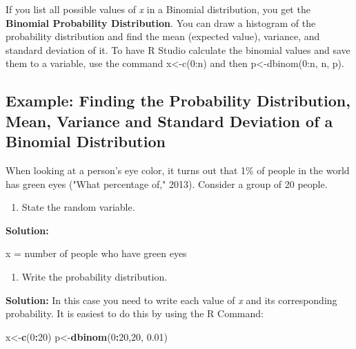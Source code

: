 \documentclass[]{book}
\newenvironment{Shaded}{\begin{snugshade}}{\end{snugshade}}
\newcommand{\DecValTok}[1]{\textcolor[rgb]{0.00,0.00,0.81}{#1}}
\newcommand{\FloatTok}[1]{\textcolor[rgb]{0.00,0.00,0.81}{#1}}
\newcommand{\KeywordTok}[1]{\textcolor[rgb]{0.13,0.29,0.53}{\textbf{#1}}}
\newcommand{\NormalTok}[1]{#1}
\newcommand{\OperatorTok}[1]{\textcolor[rgb]{0.81,0.36,0.00}{\textbf{#1}}}
\providecommand{\tightlist}{%
  \setlength{\itemsep}{0pt}\setlength{\parskip}{0pt}}
\begin{document}
If you list all possible values of \emph{x} in a Binomial distribution, you get the \textbf{Binomial Probability Distribution}. You can draw a histogram of the probability distribution and find the mean (expected value), variance, and standard deviation of it. To have R Studio calculate the binomial values and save them to a variable, use the command x\textless{}-c(0:n) and then p\textless{}-dbinom(0:n, n, p).

\hypertarget{example-finding-the-probability-distribution-mean-variance-and-standard-deviation-of-a-binomial-distribution}{%
\subsection{Example: Finding the Probability Distribution, Mean, Variance and Standard Deviation of a Binomial Distribution}\label{example-finding-the-probability-distribution-mean-variance-and-standard-deviation-of-a-binomial-distribution}}

When looking at a person's eye color, it turns out that 1\% of people in the world has green eyes ("What percentage of," 2013). Consider a group of 20 people.

\begin{enumerate}
\def\labelenumi{\alph{enumi}.}
\tightlist
\item
  State the random variable.
\end{enumerate}

\textbf{Solution:}

x = number of people who have green eyes

\begin{enumerate}
\def\labelenumi{\alph{enumi}.}
\setcounter{enumi}{1}
\tightlist
\item
  Write the probability distribution.
\end{enumerate}

\textbf{Solution:}
In this case you need to write each value of \emph{x} and its corresponding probability. It is easiest to do this by using the R Command:

\begin{Shaded}
\begin{Highlighting}[]
\NormalTok{x<-}\KeywordTok{c}\NormalTok{(}\DecValTok{0}\OperatorTok{:}\DecValTok{20}\NormalTok{)}
\NormalTok{p<-}\KeywordTok{dbinom}\NormalTok{(}\DecValTok{0}\OperatorTok{:}\DecValTok{20}\NormalTok{,}\DecValTok{20}\NormalTok{, }\FloatTok{0.01}\NormalTok{)}
\end{Highlighting}
\end{Shaded}
\end{document}
